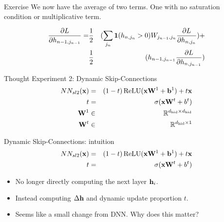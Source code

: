 \documentclass{beamer}
\begin{document}
\begin{frame}{Exercise}
  We now have the average of two terms. One with no saturation condition or multiplicative term.
  \air 
  
  \begin{eqnarray*}
    \frac{\partial L}{\partial h_{n-1,j_{n-1}} }  =  &\frac{1}{2}& (\sum_{j_n}   \mathbf{1}(h_{n, j_n} > 0) W_{j_{n-1},j_n} \frac{\partial L}{\partial h_{n, j_n}}) + \\
    &\frac{1}{2}& ( h_{n-1, j_{n-1}} \frac{\partial L}{\partial h_{n, j_{n-1}}}) \\ 
  \end{eqnarray*}
\end{frame}

\begin{frame}{Thought Experiment 2: Dynamic Skip-Connections}
  \begin{eqnarray*}
    NN_{sl2}(\boldx) &=& (1-t) \relu(\boldx \boldW^1 + \boldb^1) + t \boldx \\
    t &=& \sigma(\boldx \boldW^t + b^t) \\
    \boldW^1 &\in& \reals^{\dhid \times \dhid} \\
    \boldW^t &\in& \reals^{\dhid \times 1} 
  \end{eqnarray*}


      \begin{center}
    \end{center}
\end{frame}


\begin{frame}{Dynamic Skip-Connections: intuition}
  \begin{eqnarray*}
    NN_{sl2}(\boldx) &=& (1-t) \relu(\boldx \boldW^1 + \boldb^1) + t \boldx \\
    t &=& \sigma(\boldx \boldW^t + b^t) \\
  \end{eqnarray*}

  \begin{itemize}
  \item No longer directly computing the next layer $\mathbf{h}_i$. 
    \air 

  \item Instead computing $\Delta \mathbf{h}$ and dynamic update proportion $t$.

    \air 
  \item Seems like a small change from DNN. Why does this matter?
  \end{itemize}
\end{frame}
\end{document}
